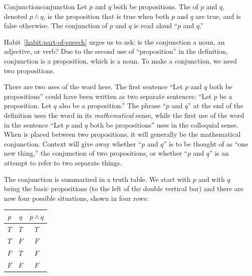 \documentclass{book}
\theoremstyle{ekimcustom}
\newcommand\defn[1]{{\color{blue}{\bf #1}}}
\begin{document}
\begin{bdefinition}{Conjunction}{conjunction}
Let $p$ and $q$ both be propositions. The \defn{conjunction} of $p$ and $q$, denoted $p \wedge q$, is the proposition that is true when both $p$ and $q$ are true, and is false otherwise. The conjunction of $p$ and $q$ is read aloud ``$p$ and $q$.''
\end{bdefinition}
Habit~\ref{habit:part-of-speech} urges us to ask: is the conjunction a noun, an adjective, or verb? Due to the second use of ``proposition'' in the definition, conjunction is a proposition, which is a noun. To make a conjunction, we need two propositions.

There are two uses of the word  here. The first sentence ``Let $p$ and $q$ both be propositions'' could have been written as two separate sentences: ``Let $p$ be a proposition. Let $q$ also be a proposition.'' The phrase ``$p$ and $q$'' at the end of the definition uses the word  in its \emph{mathematical} sense, while the first use of the word  in the sentence ``Let $p$ and $q$ both be propositions'' uses  in the colloquial sense. When  is placed between two propositions, it will generally be the mathematical conjunction. Context will give away whether ``$p$ and $q$'' is to be thought of as ``one new thing,'' the conjunction of two propositions, or whether ``$p$ and $q$'' is an attempt to refer to two separate things.

The conjunction is summarized in a truth table. We start with $p$ and with $q$ being the basic propositions (to the left of the double vertical bar) and there are now four possible situations, shown in four rows:
\begin{center}
\begin{tabular}{c|c||c}
$p$ & $q$ & $p \wedge q$ \\\hline
$T$ & $T$ & $T$\\
$T$ & $F$ & $F$\\
$F$ & $T$ & $F$\\
$F$ & $F$ & $F$
\end{tabular}
\end{center}
\end{document}
